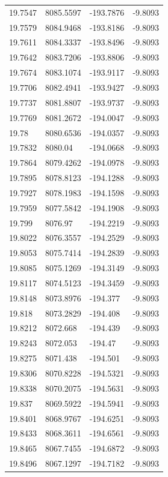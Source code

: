\begin{table}[H]
\begin{tabular}{llll}
19.7547 & 8085.5597 & -193.7876 & -9.8093 \\
19.7579 & 8084.9468 & -193.8186 & -9.8093 \\
19.7611 & 8084.3337 & -193.8496 & -9.8093 \\
19.7642 & 8083.7206 & -193.8806 & -9.8093 \\
19.7674 & 8083.1074 & -193.9117 & -9.8093 \\
19.7706 & 8082.4941 & -193.9427 & -9.8093 \\
19.7737 & 8081.8807 & -193.9737 & -9.8093 \\
19.7769 & 8081.2672 & -194.0047 & -9.8093 \\
19.78 & 8080.6536 & -194.0357 & -9.8093 \\
19.7832 & 8080.04 & -194.0668 & -9.8093 \\
19.7864 & 8079.4262 & -194.0978 & -9.8093 \\
19.7895 & 8078.8123 & -194.1288 & -9.8093 \\
19.7927 & 8078.1983 & -194.1598 & -9.8093 \\
19.7959 & 8077.5842 & -194.1908 & -9.8093 \\
19.799 & 8076.97 & -194.2219 & -9.8093 \\
19.8022 & 8076.3557 & -194.2529 & -9.8093 \\
19.8053 & 8075.7414 & -194.2839 & -9.8093 \\
19.8085 & 8075.1269 & -194.3149 & -9.8093 \\
19.8117 & 8074.5123 & -194.3459 & -9.8093 \\
19.8148 & 8073.8976 & -194.377 & -9.8093 \\
19.818 & 8073.2829 & -194.408 & -9.8093 \\
19.8212 & 8072.668 & -194.439 & -9.8093 \\
19.8243 & 8072.053 & -194.47 & -9.8093 \\
19.8275 & 8071.438 & -194.501 & -9.8093 \\
19.8306 & 8070.8228 & -194.5321 & -9.8093 \\
19.8338 & 8070.2075 & -194.5631 & -9.8093 \\
19.837 & 8069.5922 & -194.5941 & -9.8093 \\
19.8401 & 8068.9767 & -194.6251 & -9.8093 \\
19.8433 & 8068.3611 & -194.6561 & -9.8093 \\
19.8465 & 8067.7455 & -194.6872 & -9.8093 \\
19.8496 & 8067.1297 & -194.7182 & -9.8093 \\

\end{tabular}
\end{table}
